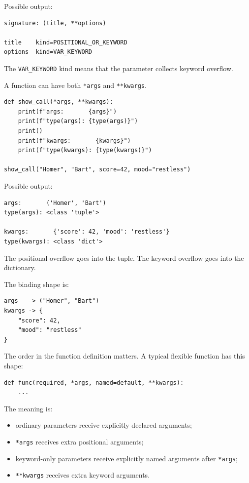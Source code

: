 Possible output:

\begin{verbatim}
signature: (title, **options)

title    kind=POSITIONAL_OR_KEYWORD
options  kind=VAR_KEYWORD
\end{verbatim}

The \texttt{VAR\_KEYWORD} kind means that the parameter collects keyword overflow.

A function can have both \texttt{*args} and \texttt{**kwargs}.

\begin{verbatim}
def show_call(*args, **kwargs):
    print(f"args:       {args}")
    print(f"type(args): {type(args)}")
    print()
    print(f"kwargs:       {kwargs}")
    print(f"type(kwargs): {type(kwargs)}")

show_call("Homer", "Bart", score=42, mood="restless")
\end{verbatim}

Possible output:

\begin{verbatim}
args:       ('Homer', 'Bart')
type(args): <class 'tuple'>

kwargs:       {'score': 42, 'mood': 'restless'}
type(kwargs): <class 'dict'>
\end{verbatim}

The positional overflow goes into the tuple. The keyword overflow goes into the dictionary.

The binding shape is:

\begin{verbatim}
args   -> ("Homer", "Bart")
kwargs -> {
    "score": 42,
    "mood": "restless"
}
\end{verbatim}

The order in the function definition matters. A typical flexible function has this shape:

\begin{verbatim}
def func(required, *args, named=default, **kwargs):
    ...
\end{verbatim}

The meaning is:

\begin{itemize}
    \item ordinary parameters receive explicitly declared arguments;
    \item \texttt{*args} receives extra positional arguments;
    \item keyword-only parameters receive explicitly named arguments after \texttt{*args};
    \item \texttt{**kwargs} receives extra keyword arguments.
\end{itemize}

